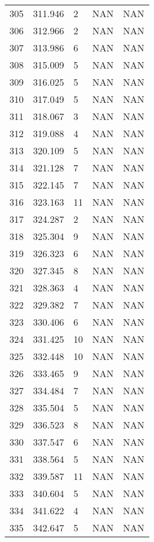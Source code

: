 \documentclass{article}
\begin{document}
\begin{longtable}{@{}lllll@{}}
				305 & 311.946 & 2     & NAN   & NAN   \\
				306 & 312.966 & 2     & NAN   & NAN   \\
				307 & 313.986 & 6     & NAN   & NAN   \\
				308 & 315.009 & 5     & NAN   & NAN   \\
				309 & 316.025 & 5     & NAN   & NAN   \\
				310 & 317.049 & 5     & NAN   & NAN   \\
				311 & 318.067 & 3     & NAN   & NAN   \\
				312 & 319.088 & 4     & NAN   & NAN   \\
				313 & 320.109 & 5     & NAN   & NAN   \\
				314 & 321.128 & 7     & NAN   & NAN   \\
				315 & 322.145 & 7     & NAN   & NAN   \\
				316 & 323.163 & 11    & NAN   & NAN   \\
				317 & 324.287 & 2     & NAN   & NAN   \\
				318 & 325.304 & 9     & NAN   & NAN   \\
				319 & 326.323 & 6     & NAN   & NAN   \\
				320 & 327.345 & 8     & NAN   & NAN   \\
				321 & 328.363 & 4     & NAN   & NAN   \\
				322 & 329.382 & 7     & NAN   & NAN   \\
				323 & 330.406 & 6     & NAN   & NAN   \\
				324 & 331.425 & 10    & NAN   & NAN   \\
				325 & 332.448 & 10    & NAN   & NAN   \\
				326 & 333.465 & 9     & NAN   & NAN   \\
				327 & 334.484 & 7     & NAN   & NAN   \\
				328 & 335.504 & 5     & NAN   & NAN   \\
				329 & 336.523 & 8     & NAN   & NAN   \\
				330 & 337.547 & 6     & NAN   & NAN   \\
				331 & 338.564 & 5     & NAN   & NAN   \\
				332 & 339.587 & 11    & NAN   & NAN   \\
				333 & 340.604 & 5     & NAN   & NAN   \\
				334 & 341.622 & 4     & NAN   & NAN   \\
				335 & 342.647 & 5     & NAN   & NAN   \\

\end{longtable}
\end{document}
